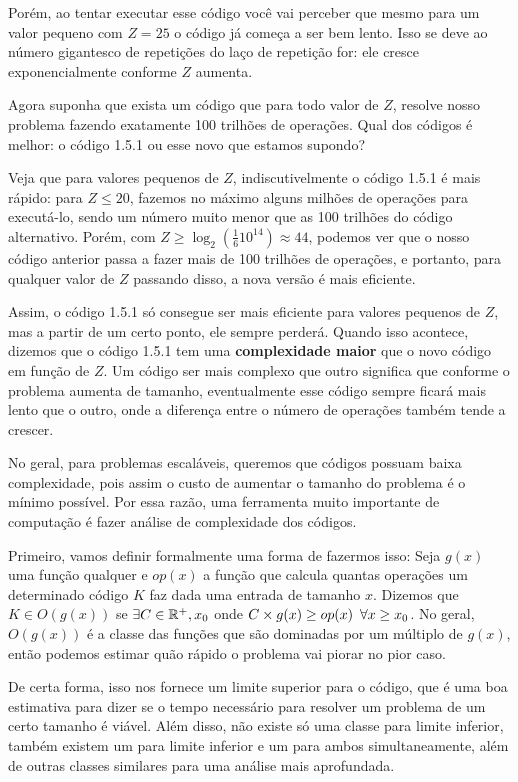 \documentclass[11pt, a4paper]{article}
\begin{document}
Porém, ao tentar executar esse código você vai perceber que mesmo para um valor pequeno com \(Z=25\) o código já começa a ser bem lento. Isso se deve ao número gigantesco de repetições do laço de repetição for: ele cresce exponencialmente conforme \(Z\) aumenta.

Agora suponha que exista um código que para todo valor de \(Z\), resolve nosso problema fazendo exatamente 100 trilhões de operações. Qual dos códigos é melhor: o código 1.5.1 ou esse novo que estamos supondo?

Veja que para valores pequenos de \(Z\), indiscutivelmente o código 1.5.1 é mais rápido: para \(Z \leq 20\), fazemos no máximo alguns milhões de operações para executá-lo, sendo um número muito menor que as 100 trilhões do código alternativo. Porém, com \(Z \geq \log_2(\frac{1}{6}10^{14}) \approx 44\), podemos ver que o nosso código anterior passa a fazer mais de 100 trilhões de operações, e portanto, para qualquer valor de \(Z\) passando disso, a nova versão é mais eficiente.

Assim, o código 1.5.1 só consegue ser mais eficiente para valores pequenos de \(Z\), mas a partir de um certo ponto, ele sempre perderá. Quando isso acontece, dizemos que o código 1.5.1 tem uma \textbf{complexidade maior} que o novo código em função de \(Z\). Um código ser mais complexo que outro significa que conforme o problema aumenta de tamanho, eventualmente esse código sempre ficará mais lento que o outro, onde a diferença entre o número de operações também tende a crescer.

No geral, para problemas escaláveis, queremos que códigos possuam baixa complexidade, pois assim o custo de aumentar o tamanho do problema é o mínimo possível. Por essa razão, uma ferramenta muito importante de computação é fazer análise de complexidade dos códigos. 

Primeiro, vamos definir formalmente uma forma de fazermos isso: Seja \(g(x)\) uma função qualquer e \(op(x)\) a função que calcula quantas operações um determinado código \(K\) faz dada uma entrada de tamanho \(x\). Dizemos que \(K \in O(g(x))\) se \(\exists C \in \Real^{+}, x_0\) onde \(C\times g(x) \geq op(x) \tb[0.5] \forall x \geq x_0\). No geral, \(O(g(x))\) é a classe das funções que são dominadas por um múltiplo de \(g(x)\), então podemos estimar quão rápido o problema vai piorar no pior caso. 

De certa forma, isso nos fornece um limite superior para o código, que é uma boa estimativa para dizer se o tempo necessário para resolver um problema de um certo tamanho é viável. Além disso, não existe só uma classe para limite inferior, também existem um para limite inferior e um para ambos simultaneamente, além de outras classes similares para uma análise mais aprofundada.
\end{document}
